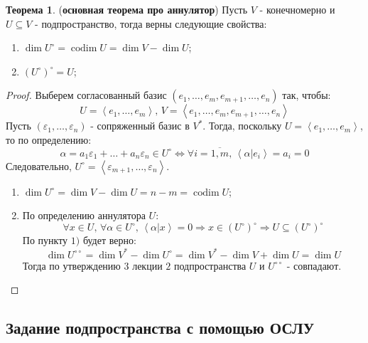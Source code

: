 \documentclass[12pt]{article}
\newcommand{\VE}{\varepsilon}
\theoremstyle{definition}
\newtheorem{theorem}{Теорема}
\DeclareMathOperator{\codim}{\text{codim}}
\newcommand{\linsp}[1]{\left\langle #1 \right\rangle }
\newcommand{\linmer}[2]{\left\langle #1 \vert #2\right\rangle }
\begin{document}
\newpage
\begin{theorem}(\textbf{основная теорема про аннулятор})
	Пусть $V$ - конечномерно и $U\subseteq V$ - подпространство, тогда верны следующие свойства:
	\begin{enumerate}[label=\arabic*)]
		\item $\dim{U^{\circ}} = \codim{U} = \dim{V} - \dim{U}$;
		\item $(U^{\circ})^{\circ} = U$;
	\end{enumerate}
\end{theorem}
\begin{proof}
	Выберем согласованный базис $(e_1,\dotsc, e_m, e_{m+1}, \dotsc, e_n)$ так, чтобы:
	$$
		U = \linsp{e_1,\dotsc, e_m}, \, V = \linsp{e_1,\dotsc, e_m, e_{m+1}, \dotsc, e_n}
	$$
	Пусть $(\VE_1,\dotsc,\VE_n)$ - сопряженный базис в $V^*$. Тогда, поскольку $U = \linsp{e_1,\dotsc, e_m}$, то по определению:
	$$
		\alpha = a_1 \VE_1 + \dotsc + a_n \VE_n \in U^{\circ} \Leftrightarrow \forall i = \overline{1,m}, \, \linmer{\alpha}{e_i} = a_i = 0
	$$
	Следовательно, $U^{\circ} = \linsp{\VE_{m+1}, \dotsc, \VE_n}$.
	\begin{enumerate}[label=\arabic*)]
		\item $\dim{U^{\circ}} = \dim{V} - \dim{U} = n - m = \codim{U}$;
		\item По определению аннулятора $U$:
		$$
			\forall x \in U, \, \forall \alpha \in U^{\circ}, \, \linmer{\alpha}{x} = 0 \Rightarrow x \in (U^{\circ})^{\circ} \Rightarrow U \subseteq (U^{\circ})^{\circ}
		$$
		По пункту $1)$ будет верно: 
		$$
			\dim{U^{\circ\circ}} = \dim{V^*} - \dim{U^{\circ}} = \dim{V^*} - \dim{V} + \dim{U} = \dim{U}
		$$ 
		Тогда по утверждению $3$ лекции $2$ подпространства $U$ и $U^{\circ\circ}$ - совпадают.
	\end{enumerate}
\end{proof}

\subsection*{Задание подпространства с помощью ОСЛУ}
\end{document}
